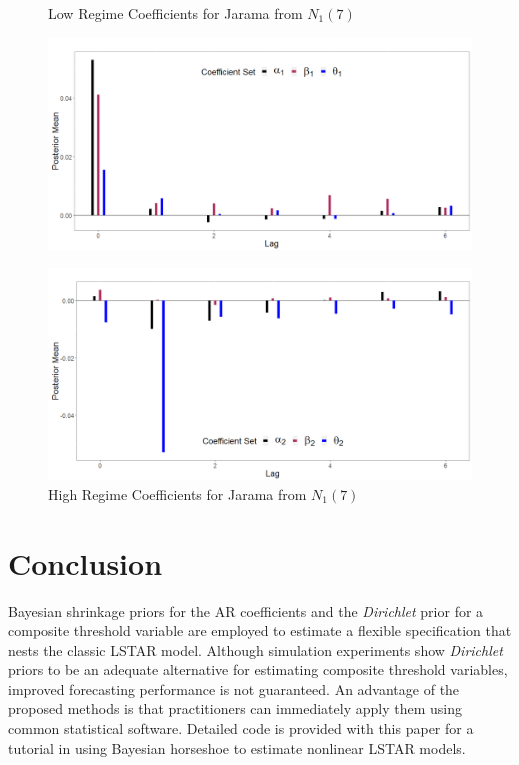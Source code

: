 \begin{figure}[!h]
\center
\begin{minipage}[h]{\textwidth}
\caption{Low Regime Coefficients for Jarama from $N_1(7)$}
\label{fig:jar1}
\includegraphics[scale=0.3]{JaramaL}
\end{minipage} \hspace{\textwidth}
\begin{minipage}[h]{\textwidth}
\caption{High Regime Coefficients for Jarama from $N_1(7)$}
\label{fig:jar2}
\includegraphics[scale=0.3]{JaramaH}
\end{minipage}
\end{figure}

\section{Conclusion}

Bayesian shrinkage priors for the AR coefficients and the \textit{Dirichlet} prior for a composite threshold variable are employed to estimate a flexible specification that nests the classic LSTAR model. Although simulation experiments show \textit{Dirichlet} priors to be an adequate alternative for estimating composite threshold variables, improved forecasting performance is not guaranteed. An advantage of the proposed methods is that practitioners can immediately apply them using common statistical software. Detailed code is provided with this paper for a tutorial in using Bayesian horseshoe to estimate nonlinear LSTAR models.

